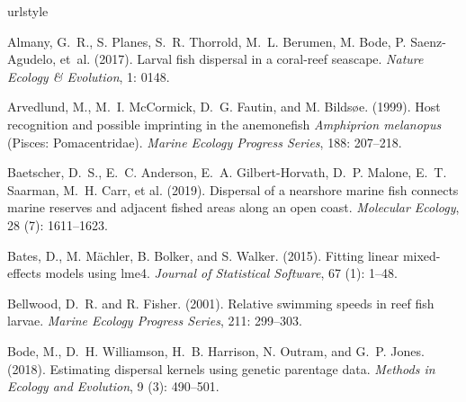 \documentclass[12pt, oneside]{article}   	%
\begin{document}
\newcommand{\noop}[1]{}
\begin{thebibliography}{66}
\providecommand{\natexlab}[1]{#1}
\providecommand{\url}[1]{\texttt{#1}}
\expandafter\ifx\csname urlstyle\endcsname\relax
  \providecommand{\doi}[1]{doi: #1}\else
  \providecommand{\doi}{doi: \begingroup \urlstyle{rm}\Url}\fi

Almany, G.~R., S. Planes, S.~R. Thorrold, M.~L. Berumen, M. Bode, P. Saenz-Agudelo, et~al. (2017).
\newblock Larval fish dispersal in a coral-reef seascape.
\newblock \emph{Nature Ecology \& Evolution}, 1: 0148.

Arvedlund, M., M.~I. McCormick, D.~G. Fautin, and M. Bilds{\o}e. (1999).
\newblock Host recognition and possible imprinting in the anemonefish
  \textit{Amphiprion melanopus} (Pisces: Pomacentridae).
\newblock \emph{Marine Ecology Progress Series}, 188: 207--218.

Baetscher, D.~S., E.~C. Anderson, E.~A. Gilbert-Horvath, D.~P.
  Malone, E.~T. Saarman, M.~H. Carr, et al. (2019).
\newblock Dispersal of a nearshore marine fish connects marine reserves and
  adjacent fished areas along an open coast.
\newblock \emph{Molecular Ecology}, 28 (7): 1611--1623.

Bates, D., M. M{\"a}chler, B. Bolker, and S. Walker. (2015).
\newblock Fitting linear mixed-effects models using {lme4}.
\newblock \emph{Journal of Statistical Software}, 67 (1):
  1--48.

Bellwood, D.~R. and R. Fisher. (2001).
\newblock Relative swimming speeds in reef fish larvae.
\newblock \emph{Marine Ecology Progress Series}, 211: 299--303.

Bode, M., D.~H. Williamson, H.~B. Harrison, N. Outram, and G.~P.
  Jones. (2018).
\newblock Estimating dispersal kernels using genetic parentage data.
\newblock \emph{Methods in Ecology and Evolution}, 9 (3):
  490--501.


\end{thebibliography}
\end{document}
